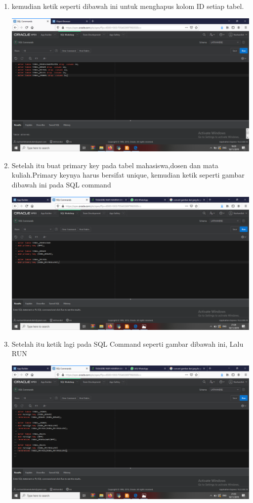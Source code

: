 \begin{enumerate}
    \item kemudian ketik seperti dibawah ini untuk menghapus kolom ID setiap tabel.
	\begin{center}
    \includegraphics[scale=0.2]{Apex/61.png}
    \end{center}

    \item Setelah itu buat primary key pada tabel mahasiswa,dosen dan mata kuliah.Primary keynya harus bersifat unique, kemudian ketik seperti gambar dibawah ini pada SQL command
	\begin{center}
    \includegraphics[scale=0.2]{Apex/62.png}
    \end{center}
    
    \item Setelah itu ketik lagi pada SQL Command seperti gambar dibawah ini, Lalu RUN
	\begin{center}
    \includegraphics[scale=0.2]{Apex/63.png}
    \end{center}


\end{enumerate}
